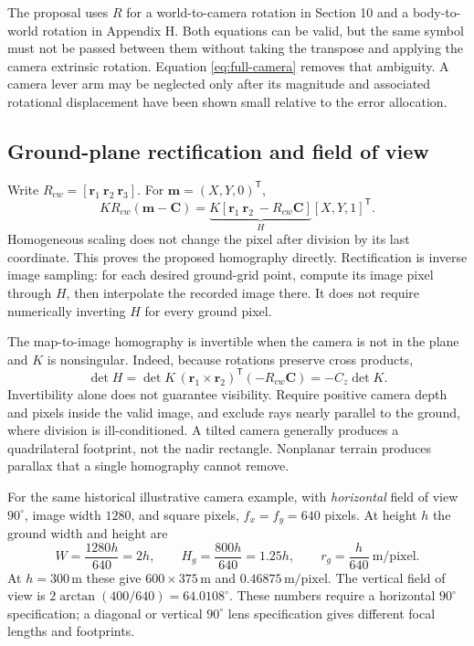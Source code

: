 \documentclass[11pt,a4paper]{article}
\numberwithin{equation}{section}
\begin{document}
The proposal uses $R$ for a world-to-camera rotation in Section 10 and
a body-to-world rotation in Appendix H. Both equations can be valid, but
the same symbol must not be passed between them without taking the
transpose and applying the camera extrinsic rotation. Equation
\eqref{eq:full-camera} removes that ambiguity. A camera lever arm may be
neglected only after its magnitude and associated rotational displacement
have been shown small relative to the error allocation.

\subsection{Ground-plane rectification and field of view}

Write $R_{cw}=[\boldsymbol r_1\ \boldsymbol r_2\ \boldsymbol r_3]$.
For $\boldsymbol m=(X,Y,0)^{\mathsf T}$,
\begin{equation}
 K R_{cw}(\boldsymbol m-\boldsymbol C)
 =\underbrace{K[\boldsymbol r_1\ \boldsymbol r_2\ -R_{cw}\boldsymbol C]}_H
   [X,Y,1]^{\mathsf T}.
 \label{eq:homography-proof}
\end{equation}
Homogeneous scaling does not change the pixel after division by its last
coordinate. This proves the proposed homography directly. Rectification
is inverse image sampling: for each desired ground-grid point, compute its
image pixel through $H$, then interpolate the recorded image there. It
does not require numerically inverting $H$ for every ground pixel.

The map-to-image homography is invertible when the camera is not in the
plane and $K$ is nonsingular. Indeed, because rotations preserve cross
products,
\begin{equation}
 \det H=\det K\,(\boldsymbol r_1\times\boldsymbol r_2)^{\mathsf T}
                   (-R_{cw}\boldsymbol C)
        =-C_z\det K.
\end{equation}
Invertibility alone does not guarantee visibility. Require positive
camera depth and pixels inside the valid image, and exclude rays nearly
parallel to the ground, where division is ill-conditioned. A tilted
camera generally produces a quadrilateral footprint, not the nadir
rectangle. Nonplanar terrain produces parallax that a single homography
cannot remove.

For the same historical illustrative camera example, with \emph{horizontal} field of view $90^\circ$, image width $1280$, and square pixels, $f_x=f_y=640$ pixels. At height $h$ the
ground width and height are
\begin{equation}
 W=\frac{1280h}{640}=2h,\qquad
 H_g=\frac{800h}{640}=1.25h,\qquad
 r_g=\frac h{640}\ \mathrm{m/pixel}.
\end{equation}
At $h=300\,\mathrm m$ these give $600\times375\,\mathrm m$ and
$0.46875\,\mathrm{m/pixel}$. The vertical field of view is
$2\arctan(400/640)=64.0108^\circ$. These numbers require a horizontal
$90^\circ$ specification; a diagonal or vertical $90^\circ$ lens
specification gives different focal lengths and footprints.
\end{document}
